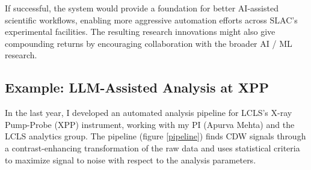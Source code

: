 \documentclass{article}
\begin{document}
If successful, the system would provide a foundation for better AI-assisted scientific workflows, enabling more aggressive automation efforts across SLAC's experimental facilities. The resulting research innovations might also give compounding returns by encouraging collaboration with the broader AI / ML research.

%

\subsection{Example: LLM-Assisted Analysis at XPP}
In the last year, I developed an automated analysis pipeline for LCLS's X-ray Pump-Probe (XPP) instrument, working with my PI (Apurva Mehta) and the LCLS analytics group. The pipeline (figure \ref{pipeline}) finds CDW signals through a contrast-enhancing transformation of the raw data and uses statistical criteria to maximize signal to noise with respect to the analysis parameters.
\end{document}
